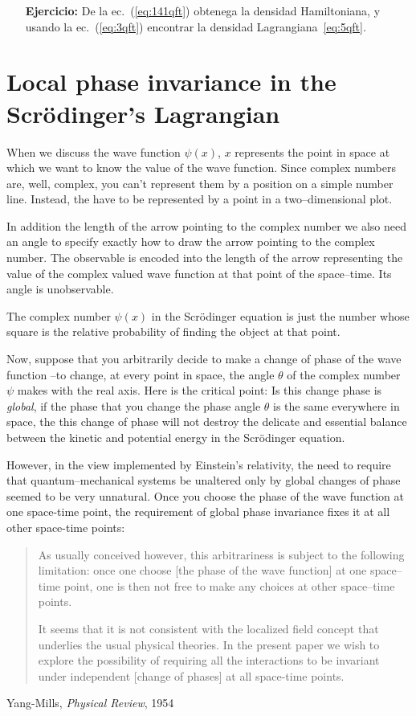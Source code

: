\begin{itemize}
\item[\textbf{Ejercicio:}]  De la ec.~(\ref{eq:141qft}) obtenega la densidad Hamiltoniana, y usando la ec.~(\ref{eq:3qft}) encontrar la densidad Lagrangiana~\eqref{eq:5qft}.
\end{itemize}


\section{Local phase invariance in the Scrödinger's Lagrangian}


When we discuss the wave function $\psi(x)$, $x$ represents the point in space at which we want to know the value of the wave function. Since complex numbers are, well, complex, you can't represent them by a position on a simple number line. Instead, the have to be represented by a point in a two--dimensional plot. 

In addition the length of the arrow pointing to the complex number we also need an angle to specify exactly how to draw the arrow pointing to the complex number. The observable is encoded into the length of the arrow representing the value of the complex valued wave function at that point of the space--time. Its angle is unobservable.

The complex number $\psi(x)$ in the Scrödinger equation is just the number whose square is the relative probability of finding the object at that point.

Now, suppose that you arbitrarily decide to make a change of phase of the wave function --to change, at every point in space, the angle $\theta$ of the complex number $\psi$ makes with the real axis. Here is the critical point: Is this change phase is \emph{global}, if the phase that you change the phase angle $\theta$ is the same everywhere in space, the this change of phase will not destroy the delicate and essential balance between the kinetic and potential energy in the Scrödinger equation.

However, in the view implemented by Einstein's relativity, the need to require that quantum--mechanical systems be unaltered only by global changes of phase seemed to be very unnatural. Once you choose the phase of the wave function at one space-time point, the requirement of global phase invariance fixes it at all other space-time points:


  \begin{quote}
\small
    As usually conceived however, this arbitrariness is subject to the following  limitation: once one choose [the phase of the wave function] at one space--time point, one is then not free to make any choices at other space--time points.

It seems that it is not consistent with the localized field concept that underlies the usual physical theories. In the present paper we wish to explore the possibility of requiring all the interactions to be invariant under independent [change of phases] at all space-time points.
  \end{quote}
  \begin{flushright}
    Yang-Mills, \emph{Physical Review}, 1954
  \end{flushright}

